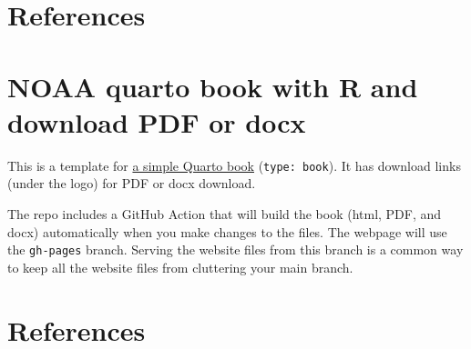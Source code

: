 \documentclass[
  letterpaper,
  oneside,
  open=any]{scrbook}
\begin{document}

\chapter{References}\label{references}


\chapter{NOAA quarto book with R and download PDF or
docx}\label{noaa-quarto-book-with-r-and-download-pdf-or-docx}

This is a template for
\href{https://nmfs-opensci.github.io/NOAA-quarto-book/}{a simple Quarto
book} (\texttt{type:\ book}). It has download links (under the logo) for
PDF or docx download.

The repo includes a GitHub Action that will build the book (html, PDF,
and docx) automatically when you make changes to the files. The webpage
will use the \texttt{gh-pages} branch. Serving the website files from
this branch is a common way to keep all the website files from
cluttering your main branch.


\chapter*{References}\label{references-1}



\backmatter
\end{document}

